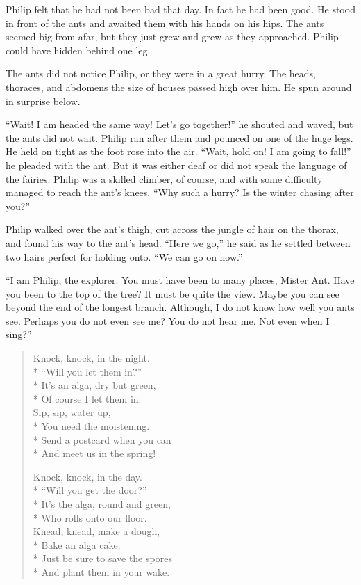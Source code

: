\documentclass[10pt, draft]{memoir}
\begin{document}
Philip felt that he had not been bad that day. In fact he had been good. He
stood in front of the ants and awaited them with his hands on his hips. The
ants seemed big from afar, but they just grew and grew as they approached.
Philip could have hidden behind one leg.

The ants did not notice Philip, or they were in a great hurry. The heads,
thoraces, and abdomens the size of houses passed high over him. He spun around
in surprise below.

``Wait! I am headed the same way! Let's go together!'' he shouted and waved,
but the ants did not wait. Philip ran after them and pounced on one of the huge
legs. He held on tight as the foot rose into the air. ``Wait, hold on! I am
going to fall!'' he pleaded with the ant. But it was either deaf or did not
speak the language of the fairies. Philip was a skilled climber, of course, and
with some difficulty managed to reach the ant's knees. ``Why such a hurry? Is
the winter chasing after you?''

Philip walked over the ant's thigh, cut across the jungle of hair on the
thorax, and found his way to the ant's head. ``Here we go,'' he said as he
settled between two hairs perfect for holding onto. ``We can go on now.''

``I am Philip, the explorer. You must have been to many places, Mister Ant.
Have you been to the top of the tree? It must be quite the view. Maybe you can
see beyond the end of the longest branch. Although, I do not know how well you
ants see. Perhaps you do not even see me? You do not hear me. Not even when I
sing?''


\begin{verse}

Knock, knock, in the night. \\*
\vin ``Will you let them in?'' \\*
It's an alga, dry but green, \\*
\vin Of course I let them in. \\
Sip, sip, water up, \\*
\vin You need the moistening. \\*
Send a postcard when you can \\*
\vin And meet us in the spring!

Knock, knock, in the day. \\*
\vin ``Will you get the door?'' \\*
It's the alga, round and green, \\*
\vin Who rolls onto our floor. \\
Knead, knead, make a dough, \\*
\vin Bake an alga cake. \\*
Just be sure to save the spores \\*
\vin And plant them in your wake.

\end{verse}
\end{document}
